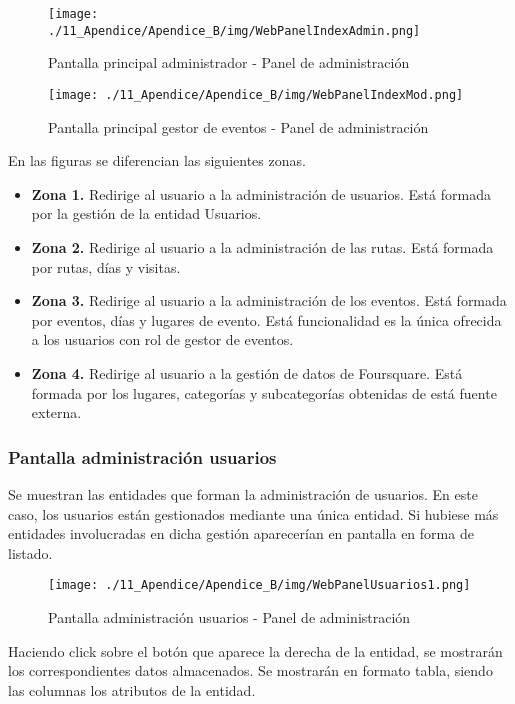\begin{figure}[H]
\centering
\texttt{[image: ./11\_Apendice/Apendice\_B/img/WebPanelIndexAdmin.png]}
\caption{Pantalla principal administrador - Panel de administración}
\end{figure}


\begin{figure}[H]
\centering
\texttt{[image: ./11\_Apendice/Apendice\_B/img/WebPanelIndexMod.png]}
\caption{Pantalla principal gestor de eventos - Panel de administración}
\end{figure}

En las figuras se diferencian las siguientes zonas.

\begin{itemize}
	\item \textbf{Zona 1. }Redirige al usuario a la administración de usuarios. Está formada por la gestión de la entidad Usuarios.
	\item \textbf{Zona 2. }Redirige al usuario a la administración de las rutas. Está formada por rutas, días y visitas.
	\item \textbf{Zona 3. }Redirige al usuario a la administración de los eventos. Está formada por eventos, días y lugares de evento. Está funcionalidad es la única ofrecida a los usuarios con rol de gestor de eventos.
	\item \textbf{Zona 4. }Redirige al usuario a la gestión de datos de Foursquare. Está formada por los lugares, categorías y subcategorías obtenidas de está fuente externa.
\end{itemize}


\subsubsection*{Pantalla administración usuarios}
Se muestran las entidades que forman la administración de usuarios. En este caso, los usuarios están gestionados mediante una única entidad. Si hubiese más entidades involucradas en dicha gestión aparecerían en pantalla en forma de listado.

\begin{figure}[H]
\centering
\texttt{[image: ./11\_Apendice/Apendice\_B/img/WebPanelUsuarios1.png]}
\caption{Pantalla administración usuarios - Panel de administración}
\end{figure}

Haciendo click sobre el botón que aparece la derecha de la entidad, se mostrarán los correspondientes datos almacenados. Se mostrarán en formato tabla, siendo las columnas los atributos de la entidad.



